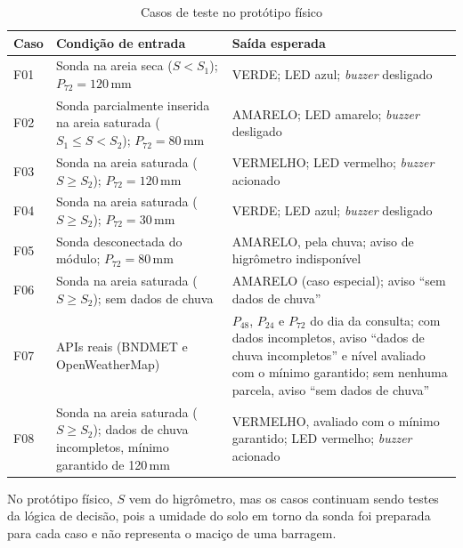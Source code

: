 \begin{table}[H]
\centering
\caption{Casos de teste no protótipo físico}
\label{tab:casos-fisico}
\small
\begin{tabular}{p{0.8cm}p{6.2cm}p{7.2cm}}
\hline
\textbf{Caso} & \textbf{Condição de entrada} & \textbf{Saída esperada} \\
\hline
F01 & Sonda na areia seca ($S < S_1$); $P_{72} = 120$\,mm & VERDE; LED azul; \textit{buzzer} desligado \\
F02 & Sonda parcialmente inserida na areia saturada ($S_1 \leq S < S_2$); $P_{72} = 80$\,mm & AMARELO; LED amarelo; \textit{buzzer} desligado \\
F03 & Sonda na areia saturada ($S \geq S_2$); $P_{72} = 120$\,mm & VERMELHO; LED vermelho; \textit{buzzer} acionado \\
F04 & Sonda na areia saturada ($S \geq S_2$); $P_{72} = 30$\,mm & VERDE; LED azul; \textit{buzzer} desligado \\
F05 & Sonda desconectada do módulo; $P_{72} = 80$\,mm & AMARELO, pela chuva; aviso de higrômetro indisponível \\
F06 & Sonda na areia saturada ($S \geq S_2$); sem dados de chuva & AMARELO (caso especial); aviso ``sem dados de chuva'' \\
F07 & APIs reais (BNDMET e OpenWeatherMap) & $P_{48}$, $P_{24}$ e $P_{72}$ do dia da consulta; com dados incompletos, aviso ``dados de chuva incompletos'' e nível avaliado com o mínimo garantido; sem nenhuma parcela, aviso ``sem dados de chuva'' \\
F08 & Sonda na areia saturada ($S \geq S_2$); dados de chuva incompletos, mínimo garantido de 120\,mm & VERMELHO, avaliado com o mínimo garantido; LED vermelho; \textit{buzzer} acionado \\
\hline
\end{tabular}
\end{table}

No protótipo físico, $S$ vem do higrômetro, mas os casos continuam sendo
testes da lógica de decisão, pois a umidade do solo em torno da sonda foi
preparada para cada caso e não representa o maciço de uma barragem.

